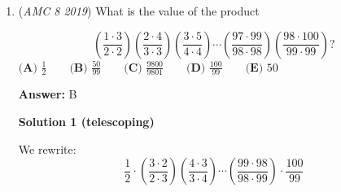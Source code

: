 \begin{enumerate}
 



\textbf{Solution 4}

Let $h$ be the amount of hours Qiang drives after his first 15 miles. Average speed, which we know is $50$ mph, means total distance over total time. For 15 miles at 30 mph, the time taken is $\frac{1}{2}$ hour, so the total time for this trip would be $\frac{1}{2} + h$ hours. For the total distance, 15 miles are traveled in the first part and $55h$ miles in the second. This gives the following equation: 

 

 \[\dfrac{15+55h}{\frac{1}{2}+h} = 50.\] 

 


 
Cross multiplying, we get that $15 + 55h = 50h + 25$, and simple algebra gives $h=2$. In 2 hours traveling at 55 mph, the distance traveled is $\frac{2 \hspace{0.05 in} \text{hours}}{1} \cdot \frac{55 \hspace{0.05 in} \text{miles}}{1 \hspace{0.05 in} \text{hour}} = 2 \cdot 55 \hspace{0.05 in} \text{miles} = 110 \hspace{0.05 in} \text{miles}$, which is choice $\boxed{\textbf{(D)}\ 110}$. 

 


 Associated Video

 - happytwin

 Solution detailing how to solve the problem: 

 - Soo, DRMS, NM

 


	\item (\textit{AMC 8 2019}) What is the value of the product 


 
 \[\left(\frac{1\cdot3}{2\cdot2}\right)\left(\frac{2\cdot4}{3\cdot3}\right)\left(\frac{3\cdot5}{4\cdot4}\right)\cdots\left(\frac{97\cdot99}{98\cdot98}\right)\left(\frac{98\cdot100}{99\cdot99}\right)?\]
$\textbf{(A) }\frac{1}{2}\qquad\textbf{(B) }\frac{50}{99}\qquad\textbf{(C) }\frac{9800}{9801}\qquad\textbf{(D) }\frac{100}{99}\qquad\textbf{(E) }50$

 \textbf{Answer: }B



\textbf{Solution 1 (telescoping)}

We rewrite: 
 \[\frac{1}{2}\cdot\left(\frac{3\cdot2}{2\cdot3}\right)\left(\frac{4\cdot3}{3\cdot4}\right)\cdots\left(\frac{99\cdot98}{98\cdot99}\right)\cdot\frac{100}{99}\]


\end{enumerate}
